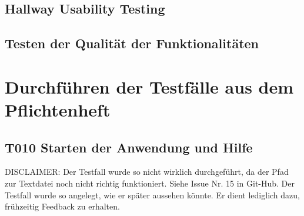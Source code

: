 \documentclass[parskip=full]{scrartcl}
\begin{document}
\subsection{Hallway Usability Testing}


\subsection{Testen der Qualität der Funktionalitäten}


\clearpage
\section{Durchführen der Testfälle aus dem Pflichtenheft} \label{testszenarien}

\subsection{\textbf{T010} Starten der Anwendung und Hilfe}

DISCLAIMER: Der Testfall wurde so nicht wirklich durchgeführt, da der Pfad zur Textdatei noch nicht richtig funktioniert. Siehe Issue Nr. 15 in Git-Hub. Der Testfall wurde so angelegt, wie er später aussehen könnte. Er dient lediglich dazu, frühzeitig Feedback zu erhalten.
\end{document}
